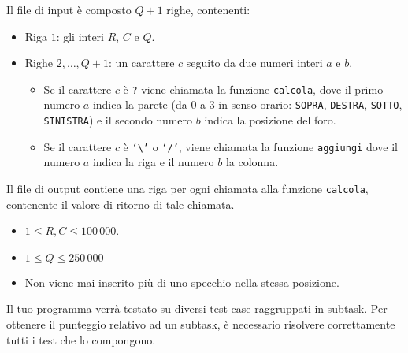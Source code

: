 Il file di input è composto $Q+1$ righe, contenenti:
\begin{itemize}[nolistsep,itemsep=2mm]
\item Riga $1$: gli interi $R$, $C$ e $Q$.
\item Righe $2, \dots, Q+1$: un carattere $c$ seguito da due numeri interi $a$ e $b$.
\begin{itemize}
	\item
	    Se il carattere $c$ è \texttt{?}
	    viene chiamata la funzione \texttt{calcola}, dove
	    il primo numero $a$ indica la parete (da $0$ a $3$ in senso orario: \texttt{SOPRA}, \texttt{DESTRA}, \texttt{SOTTO}, \texttt{SINISTRA})
	    e il secondo numero $b$ indica la posizione del foro.
	\item
	    Se il carattere $c$ è \texttt{`\textbackslash'} o \texttt{`/'},
	    viene chiamata la funzione \texttt{aggiungi} dove
	    il numero $a$ indica la riga e il numero $b$ la colonna.
\end{itemize}
\end{itemize}

Il file di output contiene una riga
per ogni chiamata alla funzione \texttt{calcola},
contenente il valore di ritorno di tale chiamata.



\Constraints

\begin{itemize}[nolistsep, itemsep=2mm]
	\item $1 \le R, C \le 100\,000$.
	\item $1 \le Q \le 250\,000$
	\item Non viene mai inserito più di uno specchio nella stessa posizione.
\end{itemize}



\Scoring

Il tuo programma verrà testato su diversi test case raggruppati in subtask.
Per ottenere il punteggio relativo ad un subtask, è necessario risolvere correttamente tutti i test che lo compongono.

